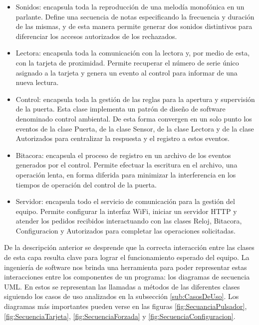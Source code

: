 \begin{itemize}
	\item Sonidos: encapsula toda la reproducción de una melodía monofónica en un parlante. Define una secuencia de notas especificando la frecuencia y duración de las mismas, y de esta manera permite generar dos sonidos distintivos para diferenciar los accesos autorizados de los rechazados.
	
	\item Lectora: encapsula toda la comunicación con la lectora y, por medio de esta, con la tarjeta de proximidad. Permite recuperar el número de serie único asignado a la tarjeta y genera un evento al control para informar de una nueva lectura.

	\item Control: encapsula toda la gestión de las reglas para la apertura y supervisión de la puerta. Esta clase implementa un patrón de diseño de software denominado control ambiental. De esta forma convergen en un solo punto los eventos de la clase Puerta, de la clase Sensor, de la clase Lectora y de la clase Autorizados para centralizar la respuesta y el registro a estos eventos. 
	
	\item Bitacora: encapsula el proceso de registro en un archivo de los eventos generados por el control. Permite efectuar la escritura en el archivo, una operación lenta, en forma diferida para minimizar la interferencia en los tiempos de operación del control de la puerta.
	
	\item Servidor: encapsula todo el servicio de comunicación para la gestión del equipo. Permite configurar la interfaz WiFi, iniciar un servidor HTTP y atender los pedidos recibidos interactuando con las clases Reloj, Bitacora, Configuracion y Autorizados para completar las operaciones solicitadas.
	
\end{itemize}

De la descripción anterior se desprende que la correcta interacción entre las clases de esta capa resulta clave para lograr el funcionamiento esperado del equipo. La ingeniería de software nos brinda una herramienta para poder representar estas interacciones entre los componentes de un programa: los diagramas de secuencia UML. En estos se representan las llamadas a métodos de las diferentes clases siguiendo los casos de uso analizados en la subsección \ref{sub:CasosDeUso}. Los diagramas más importantes pueden verse en las figuras \ref{fig:SecuanciaPulsador}, \ref{fig:SecuenciaTarjeta}, \ref{fig:SecuenciaForzada} y \ref{fig:SecuenciaConfiguracion}.

